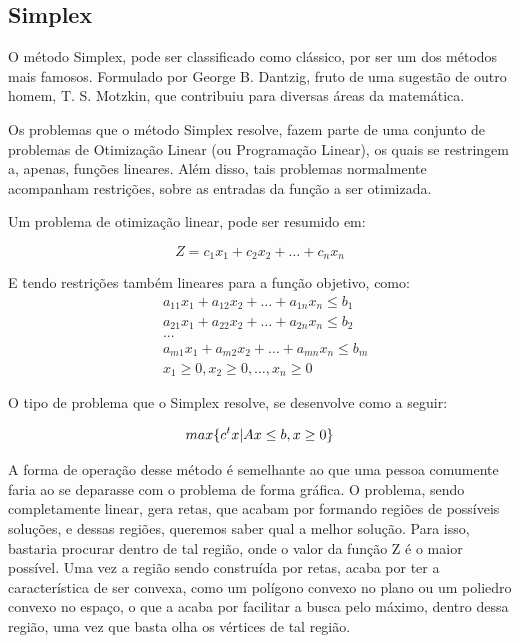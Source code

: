 \subsection{Simplex}

\hspace{0.8cm}
O método Simplex, pode ser classificado como clássico, por ser um
dos métodos mais famosos. Formulado por George B. Dantzig, fruto de uma
sugestão de outro homem, T. S. Motzkin, que contribuiu para diversas áreas da
matemática.

Os problemas que o método Simplex resolve, fazem parte de uma conjunto de
problemas de Otimização Linear (ou Programação Linear), os quais se restringem
a, apenas, funções lineares. Além disso, tais problemas normalmente acompanham
restrições, sobre as entradas da função a ser otimizada.

Um problema de otimização linear, pode ser resumido em:

\begin{equation}
        Z = c_1x_1 + c_2x_2 + … + c_nx_n
\end{equation}

E tendo restrições também lineares para a função objetivo, como:
\begin{equation}
    \begin{split}
        &   a_{11}x_1 + a_{12}x_2 + … + a_{1n}x_n \leq b_1\\
        &   a_{21}x_1 + a_{22}x_2 + … + a_{2n}x_n \leq b_2\\
        &   ...\\
        &   a_{m1}x_1 + a_{m2}x_2 + … + a_{mn}x_n \leq b_m\\
        &   x_1 \geq 0, x_2 \geq 0, …, x_n \geq 0
    \end{split}
\end{equation}

O tipo de problema que o Simplex resolve, se desenvolve como a seguir:

\begin{equation}
        max \{c^tx | Ax \leq b, x \geq 0\}\\
\end{equation}


A forma de operação desse método é semelhante ao que uma pessoa comumente faria
ao se deparasse com o problema de forma gráfica. O problema, sendo
completamente linear, gera retas, que acabam por formando regiões de
possíveis soluções, e dessas regiões, queremos saber qual a melhor solução.
Para isso, bastaria procurar dentro de tal região, onde o valor da função Z é o
maior possível. Uma vez a região sendo construída por retas, acaba por
ter a característica de ser convexa, como um polígono convexo no plano ou um
poliedro convexo no espaço, o que a acaba por facilitar a busca pelo máximo,
dentro dessa região, uma vez que basta olha os vértices de tal região.

